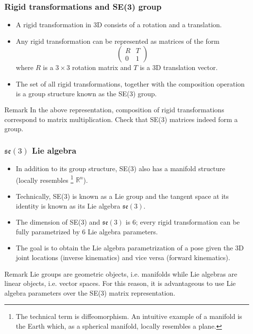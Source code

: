 \documentclass{beamer}
\begin{document}
\begin{frame}
\frametitle{Rigid transformations and SE(3) group}
\begin{itemize}
\justifying
\item A rigid transformation in 3D consists of a rotation and a translation.
\item Any rigid transformation can be represented as matrices of the form $$\left(\begin{matrix} R & T \\ 0 & 1 \end{matrix}\right)$$
where $R$ is a $3\times3$ rotation matrix and $T$ is a 3D translation vector.
\item The set of all rigid transformations, together with the composition operation is a group structure known as the SE(3) group.
\end{itemize}
\begin{block}{Remark}
\justifying
In the above representation, composition of rigid transformations correspond to matrix multiplication. Check that SE(3) matrices indeed form a group.
\end{block}
\end{frame}

\begin{frame}
\frametitle{$\mathfrak{se}(3)$ Lie algebra}
\begin{itemize}
\justifying
\item In addition to its group structure, SE(3) also has a manifold structure (locally resembles \footnote{The technical term is diffeomorphism. An intuitive example of a manifold is the Earth which, as a spherical manifold, locally resembles a plane.} $\mathbb{R}^n$).
\item Technically, SE(3) is known as a Lie group and the tangent space at its identity is known as its Lie algebra $\mathfrak{se}(3)$.
\item The dimension of SE(3) and $\mathfrak{se}(3)$ is 6; every rigid transformation can be fully parametrized by 6 Lie algebra parameters.
\item The goal is to obtain the Lie algebra parametrization of a pose given the 3D joint locations (inverse kinematics) and vice versa (forward kinematics).
\end{itemize}
\begin{block}{Remark}
\justifying
Lie groups are geometric objects, i.e. manifolds while Lie algebras are linear objects, i.e. vector spaces. For this reason, it is advantageous to use Lie algebra parameters over the SE(3) matrix representation.
\end{block}
\end{frame}
\end{document}
